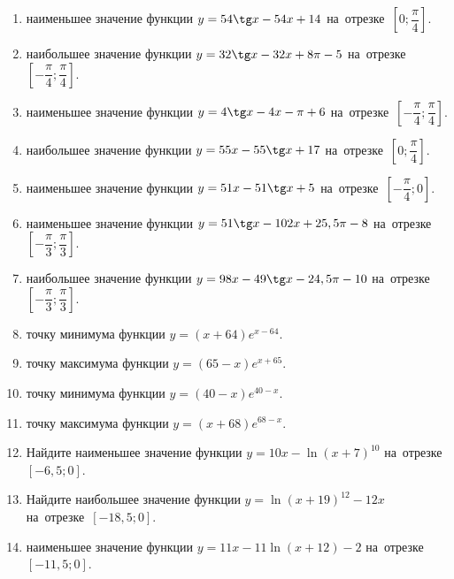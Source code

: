 \documentclass[a4paper,10pt]{article}
\begin{document}
\begin{enumerate}
\item {} наименьшее значение функции $y = 54\tg x-54x+14$ на~отрезке~$\left[0;\dfrac{\pi }{4}\right]$.

\item {} наибольшее значение функции $y=32\tg x-32x+8\pi -5$ на~отрезке~$\left[-\dfrac{\pi }{4};\dfrac{\pi }{4}\right]$.

\item {} наименьшее значение функции $y=4\tg x-4x-\pi +6$ на~отрезке~$\left[-\dfrac{\pi }{4};\dfrac{\pi }{4}\right]$.

\item {} наибольшее значение функции $y = 55x-55\tg x +17$ на~отрезке~$\left[0;\dfrac{\pi }{4}\right]$.

\item {} наименьшее значение функции $y = 51x-51\tg x +5$ на~отрезке~$\left[-\dfrac{\pi }{4};0\right]$.

\item {} наименьшее значение функции $y = 51\tg x-102x+25,5 \pi -8$ на~отрезке~$\left[-\dfrac{\pi }{3};\dfrac{\pi }{3}\right]$.

\item {} наибольшее значение функции $y = 98x-49\tg x-24,5\pi -10$ на~отрезке~$\left[-\dfrac{\pi }{3};\dfrac{\pi }{3}\right]$.

\item {} точку минимума функции $y = \left(x+64\right)e^{x-64}$.

\item {} точку максимума функции $y = \left(65-x\right)e^{x+65}$.

\item {} точку минимума функции $y = \left(40-x\right)e^{40-x}$.

\item {} точку максимума функции $y = \left(x+68\right)e^{68-x}$.

\item Найдите наименьшее значение функции $y = 10x-\ln \left(x+7\right)^{10}$ на~отрезке~$\left[-6,5;0\right]$.

\item Найдите наибольшее значение функции $y = \ln \left(x+19\right)^{12}-12x$ на~отрезке~$\left[-18,5;0\right]$.

\item {} наименьшее значение функции $y = 11x-11\ln \left(x+12\right) -2$ на~отрезке~$\left[-11,5;0\right]$.


\end{enumerate}
\end{document}

